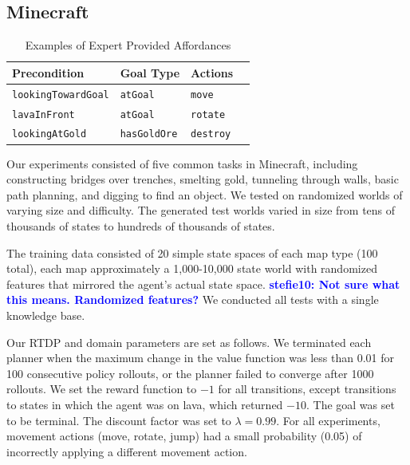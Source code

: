 \documentclass[letterpaper]{article}
\newcommand{\stnote}[1]{\textcolor{Blue}{\textbf{stefie10: #1}}}
\newcommand{\ra}[1]{\renewcommand{\arraystretch}{#1}} %
\begin{document}
\subsection{Minecraft}

\begin{table}[b]
\ra{1.4}
\begin{tabular}{@{}llll@{}}\toprule
Precondition & Goal Type & Actions \\ \midrule
\texttt{lookingTowardGoal} & \texttt{atGoal} & \texttt{move} \\
\texttt{lavaInFront} & \texttt{atGoal} & \texttt{rotate} \\
\texttt{lookingAtGold} & \texttt{hasGoldOre} & \texttt{destroy} \\
\bottomrule
\end{tabular}

\caption{Examples of Expert Provided Affordances\label{table:afford_kb_exp}}
\end{table}

Our experiments consisted of five common tasks in Minecraft, including
constructing bridges over trenches, smelting gold, tunneling
through walls, basic path planning, and digging to find an object.  We tested on 
randomized worlds of varying size and difficulty. The generated test
worlds varied in size from tens of thousands of states to hundreds of thousands of states.

The training data consisted of 20 simple state spaces of each map type
(100 total), each map approximately a 1,000-10,000 state world with
randomized features that mirrored the agent's actual state
space. \stnote{Not sure what this means.  Randomized features?} We
conducted all tests with a single knowledge base.

Our RTDP and domain parameters are set as follows. We terminated each planner
when the maximum change in the value function was less than 0.01 for
100 consecutive policy rollouts, or the planner failed to converge
after 1000 rollouts.  We set the reward function to $-1$ for all
transitions, except transitions to states in which the agent was on
lava, which returned $-10$. The goal was set to be terminal. The
discount factor was set to $\lambda = 0.99$. For all experiments,
movement actions (move, rotate, jump) had a small probability (0.05)
of incorrectly applying a different movement action.
\end{document}
